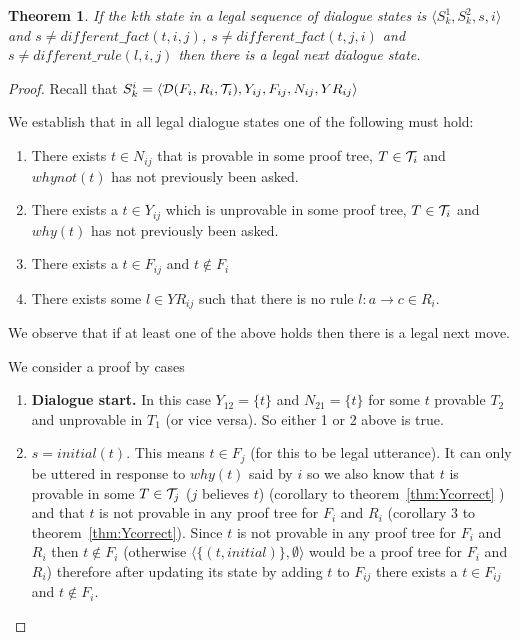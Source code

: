 \documentclass{blue-book}
\newtheorem{theorem}{Theorem}
\newcommand{\drule}[3]{\ensuremath{#1:#2 \rightarrow #3}}
\newcommand{\pt}[2]{\ensuremath{\langle #1,#2 \rangle}}
\newcommand{\node}[2]{\ensuremath{(#1, #2)}}
\newcommand{\deduction}[3]{\ensuremath{{\cal D}(#1, #2, #3)}}
\begin{document}
\begin{theorem}
If the $k$th state in a legal sequence of dialogue states is $\langle S^1_{k}, S^2_{k}, s, i \rangle$ and $s \neq  \mathit{different\_fact}(t, i, j)$, $s \neq \mathit{different\_fact}(t, j, i)$ and $s \neq \mathit{different\_rule}(l, i, j)$ then there is a legal next dialogue state.
\end{theorem}
\begin{proof}

Recall that $S^i_k = \langle \deduction{F_i}{R_i}{{\cal T}_i}, Y_{ij}, F_{ij}, N_{ij}, YR_{ij} \rangle$

We establish that in all legal dialogue states one of the following must hold:
\begin{enumerate}
\item There exists $t \in N_{ij}$ that is provable in some proof tree, $T \in {\cal T}_i$ and $whynot(t)$ has not previously been asked.
\item There exists a $t \in Y_{ij}$ which is unprovable in some proof tree, $T \in {\cal T}_i$ and $why(t)$ has not previously been asked.
\item There exists a $t \in F_{ij}$ and $t \not\in F_i$
\item There exists some $l \in YR_{ij}$ such that there is no rule $\drule{l}{a}{c} \in R_i$.
\end{enumerate}
We observe that if at least one of the above holds then there is a legal next move.

We consider a proof by cases

\begin{enumerate}
\item {\bf Dialogue start.} In this case $Y_{12} = \{t\}$ and $N_{21} = \{t\}$ for some $t$ provable $T_2$ and unprovable in $T_1$ (or vice versa).  So either 1 or 2 above is true.

\item $s = initial(t)$.  This means $t \in F_j$ (for this to be legal utterance).  It can only be uttered in response to $why(t)$ said by $i$ so we also know that $t$ is provable in some $T \in {\cal T}_j$ ($j$ believes $t$) (corollary to theorem~\ref{thm:Ycorrect} ) and that $t$ is not provable in any proof tree for $F_i$ and $R_i$ (corollary 3 to theorem~\ref{thm:Ycorrect}).  Since $t$ is not provable  in any proof tree for $F_i$ and $R_i$  then $t \not\in F_i$ (otherwise $\pt{\{\node{t}{initial}\}}{\emptyset}$ would be a proof tree for $F_i$ and $R_i$) therefore after updating its state by adding $t$ to $F_{ij}$ there exists a $t \in F_{ij}$ and $t \not\in F_i$.


\end{enumerate}
\end{proof}
\end{document}
